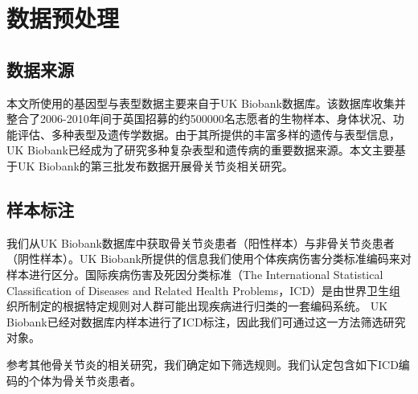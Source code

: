 \chapter{数据预处理}
\section{数据来源}

本文所使用的基因型与表型数据主要来自于UK Biobank\cite{sudlow_uk_2015}数据库。该数据库收集并整合了2006-2010年间于英国招募的约500000名志愿者的生物样本、身体状况、功能评估、多种表型及遗传学数据。由于其所提供的丰富多样的遗传与表型信息，UK Biobank已经成为了研究多种复杂表型和遗传病的重要数据来源。本文主要基于UK Biobank的第三批发布数据开展骨关节炎相关研究。

\section{样本标注}

我们从UK Biobank数据库中获取骨关节炎患者（阳性样本）与非骨关节炎患者（阴性样本）。UK Biobank所提供的信息我们使用个体疾病伤害分类标准编码来对样本进行区分。国际疾病伤害及死因分类标准（The International Statistical Classification of Diseases and Related Health Problems，ICD）是由世界卫生组织所制定的根据特定规则对人群可能出现疾病进行归类的一套编码系统。\cite{who} UK Biobank已经对数据库内样本进行了ICD标注，因此我们可通过这一方法筛选研究对象。

参考其他骨关节炎的相关研究，\cite{zengini_genome-wide_2018}我们确定如下筛选规则。我们认定包含如下ICD编码的个体为骨关节炎患者。


